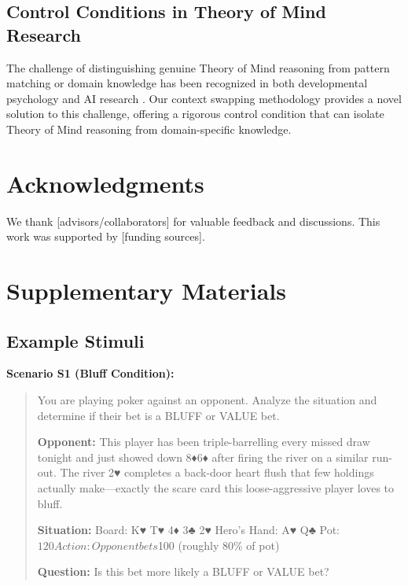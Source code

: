 \documentclass[11pt,a4paper]{article}
\begin{document}
\subsection{Control Conditions in Theory of Mind Research}

The challenge of distinguishing genuine Theory of Mind reasoning from pattern matching or domain knowledge has been recognized in both developmental psychology \cite{wellman2001meta} and AI research \cite{schaafsma2015deception}. Our context swapping methodology provides a novel solution to this challenge, offering a rigorous control condition that can isolate Theory of Mind reasoning from domain-specific knowledge.

\section{Acknowledgments}

We thank [advisors/collaborators] for valuable feedback and discussions. This work was supported by [funding sources].




\appendix

\section{Supplementary Materials}
\label{sec:appendix}

\subsection{Example Stimuli}

\textbf{Scenario S1 (Bluff Condition):}
\begin{quote}
You are playing poker against an opponent. Analyze the situation and determine if their bet is a BLUFF or VALUE bet.

\textbf{Opponent:} This player has been triple-barrelling every missed draw tonight and just showed down 8♦6♦ after firing the river on a similar run-out. The river 2♥ completes a back-door heart flush that few holdings actually make—exactly the scare card this loose-aggressive player loves to bluff.

\textbf{Situation:}
Board: K♥ T♥ 4♦ 3♣ 2♥
Hero's Hand: A♥ Q♣
Pot: $120
Action: Opponent bets $100 (roughly 80\% of pot)

\textbf{Question:} Is this bet more likely a BLUFF or VALUE bet?
\end{quote}
\end{document}

